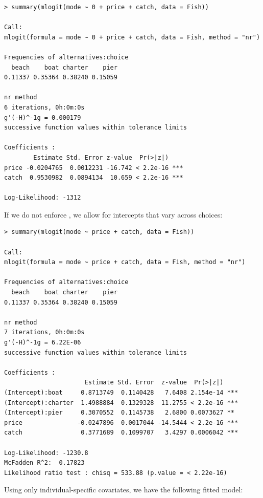\begin{lstlisting}
> summary(mlogit(mode ~ 0 + price + catch, data = Fish))

Call:
mlogit(formula = mode ~ 0 + price + catch, data = Fish, method = "nr")

Frequencies of alternatives:choice
  beach    boat charter    pier 
0.11337 0.35364 0.38240 0.15059 

nr method
6 iterations, 0h:0m:0s 
g'(-H)^-1g = 0.000179 
successive function values within tolerance limits 

Coefficients :
        Estimate Std. Error z-value  Pr(>|z|)    
price -0.0204765  0.0012231 -16.742 < 2.2e-16 ***
catch  0.9530982  0.0894134  10.659 < 2.2e-16 ***

Log-Likelihood: -1312
\end{lstlisting}

If we do not enforce , we allow for intercepts that vary across choices:

\begin{lstlisting}
> summary(mlogit(mode ~ price + catch, data = Fish))

Call:
mlogit(formula = mode ~ price + catch, data = Fish, method = "nr")

Frequencies of alternatives:choice
  beach    boat charter    pier 
0.11337 0.35364 0.38240 0.15059 

nr method
7 iterations, 0h:0m:0s 
g'(-H)^-1g = 6.22E-06 
successive function values within tolerance limits 

Coefficients :
                      Estimate Std. Error  z-value  Pr(>|z|)    
(Intercept):boat     0.8713749  0.1140428   7.6408 2.154e-14 ***
(Intercept):charter  1.4988884  0.1329328  11.2755 < 2.2e-16 ***
(Intercept):pier     0.3070552  0.1145738   2.6800 0.0073627 ** 
price               -0.0247896  0.0017044 -14.5444 < 2.2e-16 ***
catch                0.3771689  0.1099707   3.4297 0.0006042 ***

Log-Likelihood: -1230.8
McFadden R^2:  0.17823 
Likelihood ratio test : chisq = 533.88 (p.value = < 2.22e-16)
\end{lstlisting}

Using only individual-specific covariates, we have the following fitted model:

